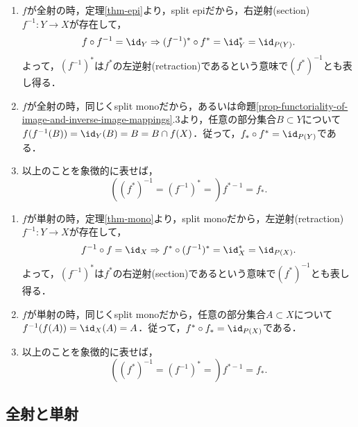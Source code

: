 \documentclass[uplatex,dvipdfmx]{jsreport}
\begin{document}
\begin{proposition}[全射の双対写像]\label{prop-dual-of-epi}\mbox{}
    \begin{enumerate}
        \item $f$が全射の時，定理\ref{thm-epi}より，split epiだから，右逆射(section) $f^{-1}:Y\to X$が存在して，\[f\circ f^{-1}=\id_Y\Rightarrow (f^{-1})^*\circ f^*=\id^*_Y=\id_{P(Y)}.\]よって，$(f^{-1})^*$は$f^*$の左逆射(retraction)であるという意味で$(f^*)^{-1}$とも表し得る．
        \item $f$が全射の時，同じくsplit monoだから，あるいは命題\ref{prop-functoriality-of-image-and-inverse-image-mappings}.3より，任意の部分集合$B\subset Y$について$f(f^{-1}(B))=\id_Y(B)=B=B\cap f(X)$．従って，$f_*\circ f^*=\id_{P(Y)}$である．
        \item 以上のことを象徴的に表せば，\[((f^*)^{-1}=(f^{-1})^*=)f^{*-1}=f_*.\]
    \end{enumerate}
\end{proposition}

\begin{proposition}[単射の双対写像]\label{prop-dual-of-mono}\mbox{}
    \begin{enumerate}
        \item $f$が単射の時，定理\ref{thm-mono}より，split monoだから，左逆射(retraction) $f^{-1}:Y\to X$が存在して，\[f^{-1}\circ f=\id_X\Rightarrow f^*\circ (f^{-1})^*=\id^*_X=\id_{P(X)}.\]よって，$(f^{-1})^*$は$f^*$の右逆射(section)であるという意味で$(f^*)^{-1}$とも表し得る．
        \item $f$が単射の時，同じくsplit monoだから，任意の部分集合$A\subset X$について$f^{-1}(f(A))=\id_X(A)=A$．従って，$f^*\circ f_*=\id_{P(X)}$である．
        \item 以上のことを象徴的に表せば，\[((f^*)^{-1}=(f^{-1})^*=)f^{*-1}=f_*.\]
    \end{enumerate}
\end{proposition}

\subsection{全射と単射}
\end{document}
